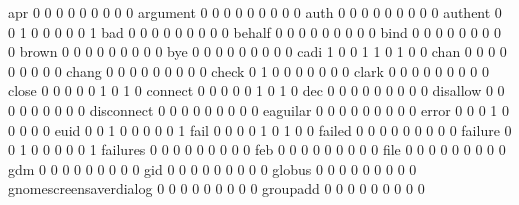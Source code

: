\documentclass[compress,8pt]{beamer}
\begin{document}
\begin{frame}
\begin{Schunk}
  apr                                        0   0   0   0   0   0   0   0   0
  argument                                   0   0   0   0   0   0   0   0   0
  auth                                       0   0   0   0   0   0   0   0   0
  authent                                    0   0   1   0   0   0   0   0   1
  bad                                        0   0   0   0   0   0   0   0   0
  behalf                                     0   0   0   0   0   0   0   0   0
  bind                                       0   0   0   0   0   0   0   0   0
  brown                                      0   0   0   0   0   0   0   0   0
  bye                                        0   0   0   0   0   0   0   0   0
  cadi                                       1   0   0   1   1   0   1   0   0
  chan                                       0   0   0   0   0   0   0   0   0
  chang                                      0   0   0   0   0   0   0   0   0
  check                                      0   1   0   0   0   0   0   0   0
  clark                                      0   0   0   0   0   0   0   0   0
  close                                      0   0   0   0   0   1   0   1   0
  connect                                    0   0   0   0   0   1   0   1   0
  dec                                        0   0   0   0   0   0   0   0   0
  disallow                                   0   0   0   0   0   0   0   0   0
  disconnect                                 0   0   0   0   0   0   0   0   0
  eaguilar                                   0   0   0   0   0   0   0   0   0
  error                                      0   0   0   1   0   0   0   0   0
  euid                                       0   0   1   0   0   0   0   0   1
  fail                                       0   0   0   0   1   0   1   0   0
  failed                                     0   0   0   0   0   0   0   0   0
  failure                                    0   0   1   0   0   0   0   0   1
  failures                                   0   0   0   0   0   0   0   0   0
  feb                                        0   0   0   0   0   0   0   0   0
  file                                       0   0   0   0   0   0   0   0   0
  gdm                                        0   0   0   0   0   0   0   0   0
  gid                                        0   0   0   0   0   0   0   0   0
  globus                                     0   0   0   0   0   0   0   0   0
  gnomescreensaverdialog                     0   0   0   0   0   0   0   0   0
  groupadd                                   0   0   0   0   0   0   0   0   0

\end{Schunk}
\end{frame}
\end{document}
